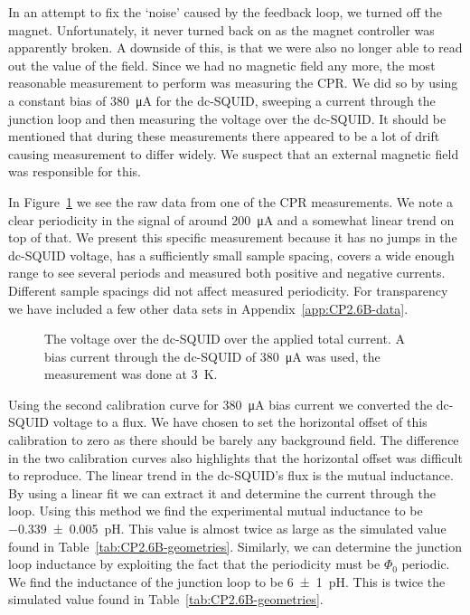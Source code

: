 In an attempt to fix the `noise' caused by the feedback loop, we turned off the magnet. Unfortunately, it never turned back on as the magnet controller was apparently broken. A downside of this, is that we were also no longer able to read out the value of the field. Since we had no magnetic field any more, the most reasonable measurement to perform was measuring the CPR. We did so by using a constant bias of \qty{380}{\micro\ampere} for the dc-SQUID, sweeping a current through the junction loop and then measuring the voltage over the dc-SQUID. It should be mentioned that during these measurements there appeared to be a lot of drift causing measurement to differ widely. We suspect that an external magnetic field was responsible for this. 

In Figure~\ref{fig:CP2.6B_SQUID_voltage_over_total_current} we see the raw data from one of the CPR measurements. We note a clear periodicity in the signal of around \qty{200}{\micro\ampere} and a somewhat linear trend on top of that. We present this specific measurement because it has no jumps in the dc-SQUID voltage, has a sufficiently small sample spacing, covers a wide enough range to see several periods and measured both positive and negative currents. Different sample spacings did not affect measured periodicity. For transparency we have included a few other data sets in Appendix~\ref{app:CP2.6B-data}.

\begin{figure}[ht!]
	\centering
	
	\caption{The voltage over the dc-SQUID over the applied total current. A bias current through the dc-SQUID of \qty{380}{\micro\ampere} was used, the measurement was done at \qty{3}{\kelvin}.}
	\label{fig:CP2.6B_SQUID_voltage_over_total_current}
\end{figure}

Using the second calibration curve for \qty{380}{\micro\ampere} bias current we converted the dc-SQUID voltage to a flux. We have chosen to set the horizontal offset of this calibration to zero as there should be barely any background field. The difference in the two calibration curves also highlights that the horizontal offset was difficult to reproduce. The linear trend in the dc-SQUID's flux is the mutual inductance. By using a linear fit we can extract it and determine the current through the loop. Using this method we find the experimental mutual inductance to be \qty{-0.339\pm0.005}{\pico\henry}. This value is almost twice as large as the simulated value found in Table~\ref{tab:CP2.6B-geometries}. Similarly, we can determine the junction loop inductance by exploiting the fact that the periodicity must be $\Phi_0$ periodic. We find the inductance of the junction loop to be \qty{6\pm1}{\pico\henry}. This is twice the simulated value found in Table~\ref{tab:CP2.6B-geometries}.

